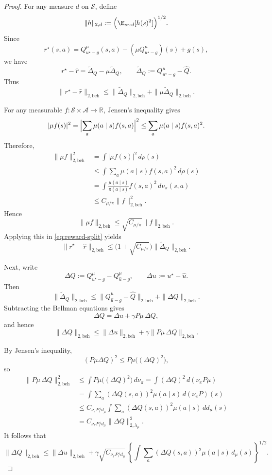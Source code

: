 \begin{proof}
For any measure \(d\) on \(\mathcal S\), define
\[
\|h\|_{2,d} := \Bigl(\E_{s \sim d}[h(s)^2]\Bigr)^{1/2}.
\]
Since
\[
r^\star(s,a)
=
Q^\mu_{u^\star-g}(s,a)
-
(\mu Q^\mu_{u^\star-g})(s)
+
g(s),
\]
we have
\[
r^\star-\hat r
=
\widetilde\Delta_Q-\mu\widetilde\Delta_Q,
\qquad
\widetilde\Delta_Q:=Q^\mu_{u^\star-g}-\hat Q.
\]
Thus
\begin{equation}
\label{eq:reward-split}
\|r^\star-\hat r\|_{2,\mathrm{beh}}
\le
\|\widetilde\Delta_Q\|_{2,\mathrm{beh}}
+
\|\mu\widetilde\Delta_Q\|_{2,\mathrm{beh}}.
\end{equation}

For any measurable \(f:\mathcal S\times\mathcal A\to\mathbb R\), Jensen's
inequality gives
\[
|\mu f(s)|^2
=
\Bigl|\sum_a \mu(a\mid s)f(s,a)\Bigr|^2
\le
\sum_a \mu(a\mid s)f(s,a)^2.
\]
Therefore,
\begin{align*}
\|\mu f\|_{2,\mathrm{beh}}^2
&=
\int |\mu f(s)|^2\,d\rho(s) \\
&\le
\int \sum_a \mu(a\mid s)f(s,a)^2\,d\rho(s) \\
&=
\int \frac{\mu(a\mid s)}{\pi(a\mid s)} f(s,a)^2\,d\nu_\pi(s,a) \\
&\le
C_{\mu/\pi}\|f\|_{2,\mathrm{beh}}^2.
\end{align*}
Hence
\[
\|\mu f\|_{2,\mathrm{beh}}
\le
\sqrt{C_{\mu/\pi}}\|f\|_{2,\mathrm{beh}}.
\]
Applying this in \eqref{eq:reward-split} yields
\begin{equation}
\label{eq:reward-to-Q}
\|r^\star-\hat r\|_{2,\mathrm{beh}}
\le
\bigl(1+\sqrt{C_{\mu/\pi}}\bigr)
\|\widetilde\Delta_Q\|_{2,\mathrm{beh}}.
\end{equation}

Next, write
\[
\Delta Q:=Q^\mu_{u^\star-g}-Q^\mu_{\hat u-g},
\qquad
\Delta u:=u^\star-\hat u.
\]
Then
\begin{equation}
\label{eq:Q-triangle}
\|\widetilde\Delta_Q\|_{2,\mathrm{beh}}
\le
\|Q^\mu_{\hat u-g}-\hat Q\|_{2,\mathrm{beh}}
+
\|\Delta Q\|_{2,\mathrm{beh}}.
\end{equation}
Subtracting the Bellman equations gives
\[
\Delta Q=\Delta u+\gamma P\mu\,\Delta Q,
\]
and hence
\[
\|\Delta Q\|_{2,\mathrm{beh}}
\le
\|\Delta u\|_{2,\mathrm{beh}}
+
\gamma\|P\mu\,\Delta Q\|_{2,\mathrm{beh}}.
\]

By Jensen's inequality,
\[
(P\mu \Delta Q)^2 \le P\mu\bigl((\Delta Q)^2\bigr),
\]
so
\begin{align*}
\|P\mu\,\Delta Q\|_{2,\mathrm{beh}}^2
&\le
\int P\mu\bigl((\Delta Q)^2\bigr)\,d\nu_\pi
=
\int (\Delta Q)^2\,d(\nu_\pi P\mu) \\
&=
\int \sum_a (\Delta Q(s,a))^2 \mu(a\mid s)\, d(\nu_\pi P)(s) \\
&\le
C_{\nu_\pi P/d_\mu}
\int \sum_a (\Delta Q(s,a))^2 \mu(a\mid s)\, d d_\mu(s) \\
&=
C_{\nu_\pi P/d_\mu}\|\Delta Q\|_{2,\lambda_\mu}^2.
\end{align*}
It follows that
\begin{equation}
\label{eq:DeltaQ-beh}
\|\Delta Q\|_{2,\mathrm{beh}}
\le
\|\Delta u\|_{2,\mathrm{beh}}
+
\gamma\sqrt{C_{\nu_\pi P/d_\mu}}\,
\left\{
\int \sum_a (\Delta Q(s,a))^2\mu(a\mid s)\,d_\mu(s)
\right\}^{1/2}.
\end{equation}


\end{proof}
